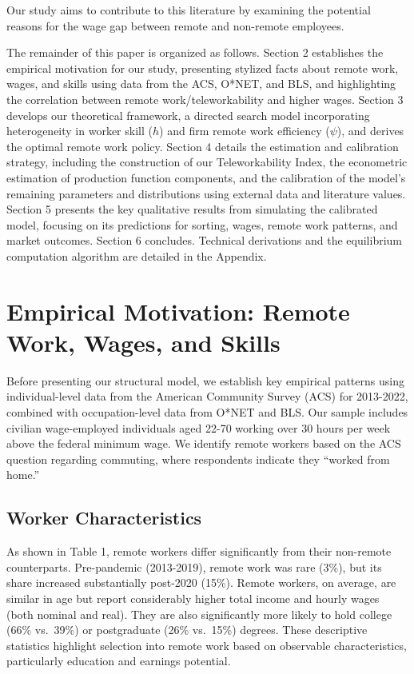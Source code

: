 \documentclass[
  11pt,
  letterpaper,
  DIV=11,
  numbers=noendperiod]{scrartcl}
\theoremstyle{plain}
\theoremstyle{remark}
\begin{document}
Our study aims to contribute to this literature by examining the
potential reasons for the wage gap between remote and non-remote
employees.

The remainder of this paper is organized as follows. Section 2
establishes the empirical motivation for our study, presenting stylized
facts about remote work, wages, and skills using data from the ACS,
O*NET, and BLS, and highlighting the correlation between remote
work/teleworkability and higher wages. Section 3 develops our
theoretical framework, a directed search model incorporating
heterogeneity in worker skill (\(h\)) and firm remote work efficiency
(\(\psi\)), and derives the optimal remote work policy. Section 4
details the estimation and calibration strategy, including the
construction of our Teleworkability Index, the econometric estimation of
production function components, and the calibration of the model's
remaining parameters and distributions using external data and
literature values. Section 5 presents the key qualitative results from
simulating the calibrated model, focusing on its predictions for
sorting, wages, remote work patterns, and market outcomes. Section 6
concludes. Technical derivations and the equilibrium computation
algorithm are detailed in the Appendix.

\section{Empirical Motivation: Remote Work, Wages, and
Skills}\label{empirical-motivation-remote-work-wages-and-skills}

Before presenting our structural model, we establish key empirical
patterns using individual-level data from the American Community Survey
(ACS) for 2013-2022, combined with occupation-level data from O*NET and
BLS. Our sample includes civilian wage-employed individuals aged 22-70
working over 30 hours per week above the federal minimum wage. We
identify remote workers based on the ACS question regarding commuting,
where respondents indicate they ``worked from home.''

\subsection{Worker Characteristics}\label{worker-characteristics}

As shown in Table 1, remote workers differ significantly from their
non-remote counterparts. Pre-pandemic (2013-2019), remote work was rare
(3\%), but its share increased substantially post-2020 (15\%). Remote
workers, on average, are similar in age but report considerably higher
total income and hourly wages (both nominal and real). They are also
significantly more likely to hold college (66\% vs.~39\%) or
postgraduate (26\% vs.~15\%) degrees. These descriptive statistics
highlight selection into remote work based on observable
characteristics, particularly education and earnings potential.
\end{document}
